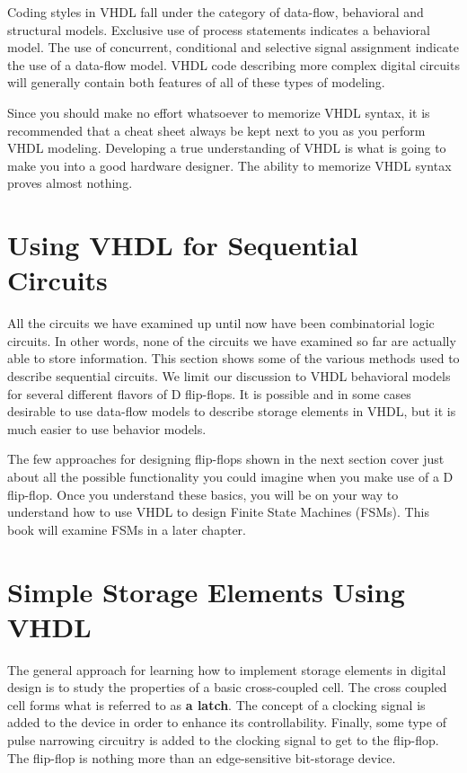 Coding styles in VHDL fall under the category of data-flow, behavioral and structural models. Exclusive use of process statements indicates a   behavioral model. The use of concurrent, conditional and selective signal assignment indicate the use of a data-flow model. VHDL code describing more complex digital circuits will generally contain both features of all of these types of modeling. 

Since you should make no effort whatsoever to memorize VHDL syntax, it is recommended that a cheat sheet always be kept next to you as you perform VHDL modeling. Developing a true understanding of VHDL is what is going to make you into a good hardware designer. The ability to memorize VHDL syntax proves almost nothing. 

\section{Using VHDL for Sequential Circuits}
All the circuits we have examined up until now have been combinatorial logic circuits. In other words, none of the circuits we have examined so far are actually able to store information. This section shows some of the various methods used to describe sequential circuits. We limit our discussion to VHDL behavioral models for several different flavors of D flip-flops. It is possible and in some cases desirable to use data-flow models to describe storage elements in VHDL, but it is much easier to use behavior models.   

The few approaches for designing flip-flops shown in the next section cover just about all the possible functionality you could imagine when you make use of a D flip-flop. Once you understand these basics, you will be on your way to understand how to use VHDL to design Finite State Machines (FSMs). This book will examine FSMs in a later chapter.

\section{Simple Storage Elements Using VHDL}
The general approach for learning how to implement storage elements in digital design is to study the properties of a basic cross-coupled cell. The cross coupled cell forms what is referred to as \textbf{a latch}. The concept of a clocking signal is added to the device in order to enhance its controllability. Finally, some type of pulse narrowing circuitry is added to the clocking signal to get to the flip-flop. The flip-flop is nothing more than an edge-sensitive bit-storage device.

